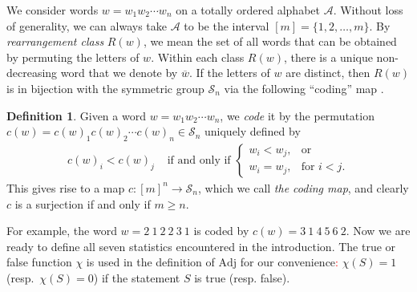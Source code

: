 \documentclass[12pt]{amsart}
\numberwithin{equation}{section}
\theoremstyle{plain}
\theoremstyle{definition}
\newtheorem{Def}[theorem]{Definition}
\def\Adj{\mathrm{Adj}}
\def\SS{\mathcal{S}}
\begin{document}
We consider words $w=w_1w_2\cdots w_n$ on a totally ordered alphabet $\mathscr{A}$. Without loss of generality, we can always take $\mathscr{A}$ to be the interval $[m]=\{1,2,\ldots,m\}$. By \emph{rearrangement class} $R(w)$, we mean the set of all words that can be obtained by permuting the letters of $w$. Within each class $R(w)$, there is a unique non-decreasing word that we denote by $\overline{w}$. If the letters of $w$ are distinct, then $R(w)$ is in bijection with the symmetric group $\SS_n$ via the following ``coding'' map \cite{CSZ}.
\begin{Def}\label{c}
Given a word $w=w_1w_2\cdots w_n$, we \emph{code} it by the permutation $c(w)=c(w)_1c(w)_2\cdots c(w)_n\in\SS_n$ uniquely defined by
\begin{align*}
c(w)_i < c(w)_j & \text{ if and only if } \begin{cases} w_i<w_j, & \text{or}\\ w_i=w_j, & \text{for }i<j.\end{cases}
\end{align*}
This gives rise to a map $c:[m]^n\rightarrow \SS_n$, which we call \emph{the coding map}, and clearly $c$ is a 
surjection if and only if $m\geq n$.
\end{Def}
For example, the word $w=2~1~2~2~3~1$ is coded by $c(w)=3~1~4~5~6~2$. Now we are ready to define all seven statistics encountered in the introduction. The true or false function $\chi$ is used in the definition of $\Adj$ for our 
convenience\textcolor{red}{:} $\chi(S)=1$ (resp.~$\chi(S)=0$) if the statement $S$ is true (resp. false).
\end{document}
